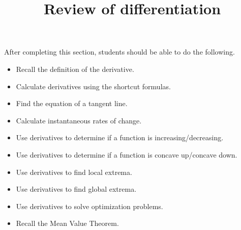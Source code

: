 \documentclass{ximera}
\title{Review of differentiation}
\begin{document}
\begin{abstract} 
\end{abstract}

\maketitle

\begin{sectionOutcomes}
After completing this section, students should be able to do the following.

\begin{itemize}
	\item Recall the definition of the derivative.
	\item Calculate derivatives using the shortcut formulas.
	\item Find the equation of a tangent line.
	\item Calculate instantaneous rates of change.
	\item Use derivatives to determine if a function is increasing/decreasing.
	\item Use derivatives to determine if a function is concave up/concave down.
	\item Use derivatives to find local extrema.
	\item Use derivatives to find global extrema.
	\item Use derivatives to solve optimization problems.
	\item Recall the Mean Value Theorem.
\end{itemize}
\end{sectionOutcomes}
\end{document}
